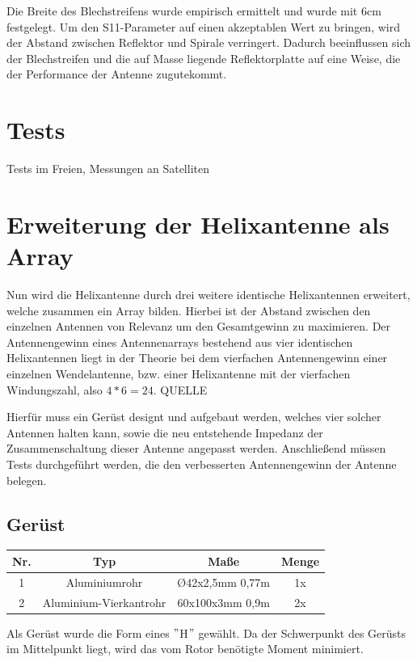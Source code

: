 Die Breite des Blechstreifens wurde empirisch ermittelt und wurde mit 6cm festgelegt. Um den S11-Parameter auf einen akzeptablen Wert zu bringen, wird der Abstand zwischen Reflektor und Spirale verringert. Dadurch beeinflussen sich der Blechstreifen und die auf Masse liegende Reflektorplatte auf eine Weise, die der Performance der Antenne zugutekommt.

\section{Tests}
Tests im Freien, Messungen an Satelliten

\section{Erweiterung der Helixantenne als Array}
Nun wird die Helixantenne durch drei weitere identische Helixantennen erweitert, welche zusammen ein Array bilden. Hierbei ist der Abstand zwischen den einzelnen Antennen von Relevanz um den Gesamtgewinn zu maximieren.
Der Antennengewinn eines Antennenarrays bestehend aus vier identischen Helixantennen liegt in der Theorie bei dem vierfachen Antennengewinn einer einzelnen Wendelantenne, bzw. einer Helixantenne mit der vierfachen Windungszahl, also $4*6=24$. QUELLE

Hierfür muss ein Gerüst designt und aufgebaut werden, welches vier solcher Antennen halten kann, sowie die neu entstehende Impedanz der Zusammenschaltung dieser Antenne angepasst werden. Anschließend müssen Tests durchgeführt werden, die den verbesserten Antennengewinn der Antenne belegen.

\subsection{Gerüst}

\begin{tabular}{|c|c|c|c|}
	\hline
	Nr. & Typ & Maße & Menge \\
	\hline
	1 & Aluminiumrohr & \O42x2,5mm 0,77m & 1x \\
	\hline
	2 & Aluminium-Vierkantrohr & 60x100x3mm 0,9m & 2x \\
	\hline
\end{tabular}

Als Gerüst wurde die Form eines $"$H$"$ gewählt. Da der Schwerpunkt des Gerüsts im Mittelpunkt liegt, wird das vom Rotor benötigte Moment minimiert. 

